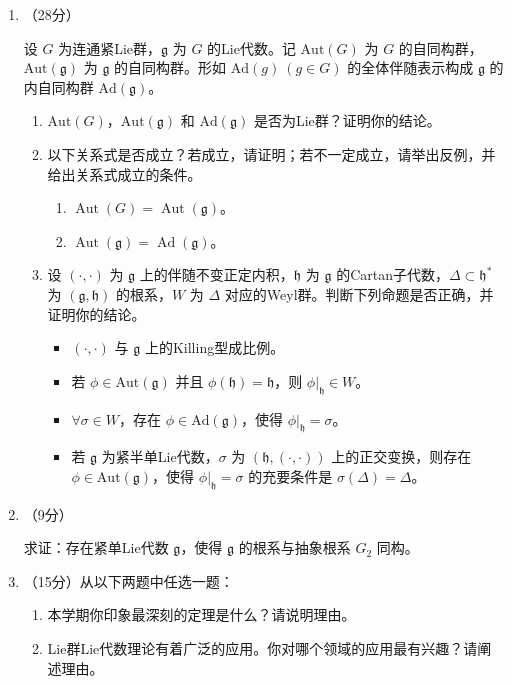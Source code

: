 \begin{enumerate}
\item[三、]（28分）

设 $G$ 为连通紧Lie群，$\mathfrak{g}$ 为 $G$ 的Lie代数。记 $\mathrm{Aut}(G)$ 为 $G$ 的自同构群，$\mathrm{Aut}(\mathfrak{g})$ 为 $\mathfrak{g}$ 的自同构群。形如 $\mathrm{Ad}(g)\ (g \in G)$ 的全体伴随表示构成 $\mathfrak{g}$ 的内自同构群 $\mathrm{Ad}(\mathfrak{g})$。

\begin{enumerate}
\item $\mathrm{Aut}(G)$，$\mathrm{Aut}(\mathfrak{g})$ 和 $\mathrm{Ad}(\mathfrak{g})$ 是否为Lie群？证明你的结论。

\item 以下关系式是否成立？若成立，请证明；若不一定成立，请举出反例，并给出关系式成立的条件。
\begin{enumerate}[label=$\bullet$]
\item $\operatorname{Aut}(G)=\operatorname{Aut}(\mathfrak{g})$。
\item $\operatorname{Aut}(\mathfrak{g})=\operatorname{Ad}(\mathfrak{g})$。
\end{enumerate}

\item 设 $(\cdot,\cdot)$ 为 $\mathfrak{g}$ 上的伴随不变正定内积，$\mathfrak{h}$ 为 $\mathfrak{g}$ 的Cartan子代数，$\Delta \subset \mathfrak{h}^*$ 为 $(\mathfrak{g},\mathfrak{h})$ 的根系，$W$ 为 $\Delta$ 对应的Weyl群。判断下列命题是否正确，并证明你的结论。
\begin{itemize}
\item $(\cdot,\cdot)$ 与 $\mathfrak{g}$ 上的Killing型成比例。
\item 若 $\phi \in \mathrm{Aut}(\mathfrak{g})$ 并且 $\phi(\mathfrak{h}) = \mathfrak{h}$，则 $\phi|_{\mathfrak{h}} \in W$。
\item $\forall \sigma \in W$，存在 $\phi \in \mathrm{Ad}(\mathfrak{g})$，使得 $\phi|_{\mathfrak{h}} = \sigma$。
\item 若 $\mathfrak{g}$ 为紧半单Lie代数，$\sigma$ 为 $(\mathfrak{h},(\cdot,\cdot))$ 上的正交变换，则存在 $\phi \in \mathrm{Aut}(\mathfrak{g})$，使得 $\phi|_{\mathfrak{h}} = \sigma$ 的充要条件是 $\sigma(\Delta) = \Delta$。
\end{itemize}
\end{enumerate}

\item[四、]（9分）

求证：存在紧单Lie代数 $\mathfrak{g}$，使得 $\mathfrak{g}$ 的根系与抽象根系 $G_2$ 同构。

\item[五、]（15分）从以下两题中任选一题：

\begin{enumerate}
\item 本学期你印象最深刻的定理是什么？请说明理由。
\item Lie群Lie代数理论有着广泛的应用。你对哪个领域的应用最有兴趣？请阐述理由。
\end{enumerate}

\end{enumerate}

